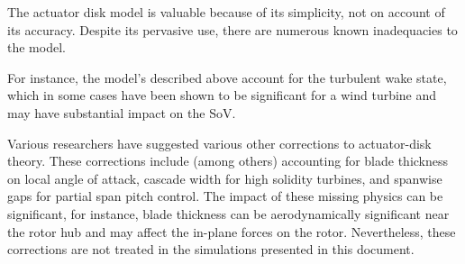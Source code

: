 

The actuator disk model is valuable because of its simplicity, not on
account of its accuracy. Despite its pervasive use, there are numerous
known inadequacies to the model. 


For instance, the model's described above account for the turbulent wake
state, which in some cases have been shown to be significant for a wind
turbine\cite{churchfield2012numerical} and may have substantial impact
on the SoV. 

Various researchers\cite{Moriarty_aerodyntheory,wilson1978design} have
suggested various other corrections to actuator-disk theory. These
corrections include (among others) accounting for blade thickness on
local angle of attack, cascade width for high solidity turbines, and
spanwise gaps for partial span pitch control. The impact of these
missing physics can be significant, for instance, blade thickness
can be aerodynamically significant near the rotor hub and may 
affect the in-plane forces on the rotor. Nevertheless,
these corrections are not treated in the simulations presented in this
document. 

